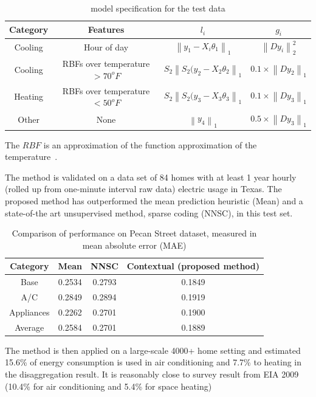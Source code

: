 \documentclass[12pt]{article}
\begin{document}
\begin{table}[h!]
  \centering
  \begin{tabular}{c|c|c|c}
    \hline
    Category&Features&$l_i$&$g_i$\\
    \hline
    Cooling&Hour of day&$\left\|y_1 - X_i\theta_1\right\|_1$&$\left\|Dy_i\right\|_2^2$\\
    Cooling&RBFs over temperature $> 70^oF$&$S_2\left\|S_2(y_2 - X_2\theta_2\right\|_1$&$0.1 \times \left\|Dy_2\right\|_1$\\
    Heating&RBFs over temperature $< 50^oF$&$S_2\left\|S_2(y_3 - X_3\theta_3\right\|_1$&$0.1 \times \left\|Dy_3\right\|_1$\\
    Other&None&$\left\|y_4\right\|_1$&$0.5 \times \left\|Dy_3\right\|_1$\\
    \hline
  \end{tabular}
  \caption{model specification for the test data}
  \label{tab:dis}
\end{table}
The $RBF$ is an approximation of the function approximation of the
temperature~\cite{elair}.

The method is validated on a data set of 84 homes with at least 1 year
hourly (rolled up from one-minute interval raw data) electric usage in
Texas. The proposed method has outperformed the mean prediction
heuristic (Mean) and a state-of-the art unsupervised method, sparse coding (NNSC),
in this test set.

\begin{table}[h!]
  \centering
  \begin{tabular}{c|c|c|c}
    \hline
    Category&Mean&NNSC&Contextual (proposed method)\\
    \hline
    Base&0.2534&0.2793&0.1849\\
    A/C&0.2849&0.2894&0.1919\\
    Appliances&0.2262&0.2701&0.1900\\
    Average&0.2584&0.2701&0.1889\\
    \hline
  \end{tabular}
  \caption{Comparison of performance on Pecan Street
dataset, measured in mean absolute error (MAE)}
\label{tab:maeContext}
\end{table}
The method is then applied on a large-scale 4000+ home setting and
estimated 15.6\% of energy consumption is used in air conditioning and
7.7\% to heating in the disaggregation result. It is reasonably close
to survey result from EIA 2009 (10.4\% for air conditioning and 5.4\%
for space heating)
\end{document}
